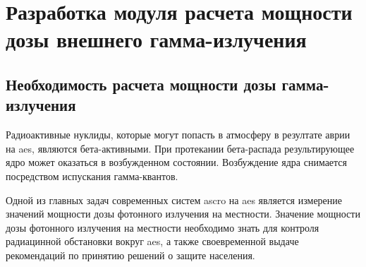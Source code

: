 
\chapter{Разработка модуля расчета мощности дозы внешнего гамма-излучения}
\label{chapter_dose}

\section{Необходимость расчета мощности дозы гамма-излучения}

Радиоактивные нуклиды, которые могут попасть в атмосферу в резултате аврии на \ac{aes}, являются бета-активными. При 
протекании бета-распада результирующее ядро может оказаться в возбужденном состоянии. Возбуждение ядра снимается 
посредством испускания гамма-квантов.

Одной из главных задач современных систем \ac{ascro} на \ac{aes} является измерение значений мощности дозы фотонного 
излучения на местности. Значение мощности дозы фотонного излучения на местности необходимо знать для контроля 
радиацинной обстановки вокруг \ac{aes}, а также своевременной выдаче рекомендаций по принятию решений о защите 
населения.
